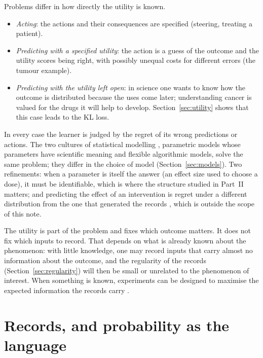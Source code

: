\documentclass[11pt]{article}
\theoremstyle{definition}
\theoremstyle{plain}
\theoremstyle{remark}
\begin{document}
Problems differ in how directly the utility is known.
\begin{itemize}[nosep]
\item \emph{Acting}: the actions and their consequences are specified
  (steering, treating a patient).
\item \emph{Predicting with a specified utility}: the action is a guess
  of the outcome and the utility scores being right, with possibly
  unequal costs for different errors (the tumour example).
\item \emph{Predicting with the utility left open}: in science one
  wants to know how the outcome is distributed because the uses come
  later; understanding cancer is valued for the drugs it will help to
  develop. Section~\ref{sec:utility} shows that this case leads to the
  KL loss.
\end{itemize}
In every case the learner is judged by the regret of its wrong
predictions or actions. The two cultures of statistical modelling
\cite{breiman2001}, parametric models whose parameters have scientific
meaning and flexible algorithmic models, solve the same problem; they
differ in the choice of model (Section~\ref{sec:models}). Two
refinements: when a parameter is itself the answer (an effect size used
to choose a dose), it must be identifiable, which is where the
structure studied in Part~II matters; and predicting the effect of an
intervention is regret under a different distribution from the one
that generated the records \cite{pearl2009}, which is outside the
scope of this note.

The utility is part of the problem and fixes which outcome matters. It
does not fix which inputs to record. That depends on what is already
known about the phenomenon: with little knowledge, one may record
inputs that carry almost no information about the outcome, and the
regularity of the records (Section~\ref{sec:regularity}) will then be
small or unrelated to the phenomenon of interest. When something is
known, experiments can be designed to maximise the expected information
the records carry \cite{lindley1956}.

\section{Records, and probability as the language}\label{sec:records}
\end{document}
